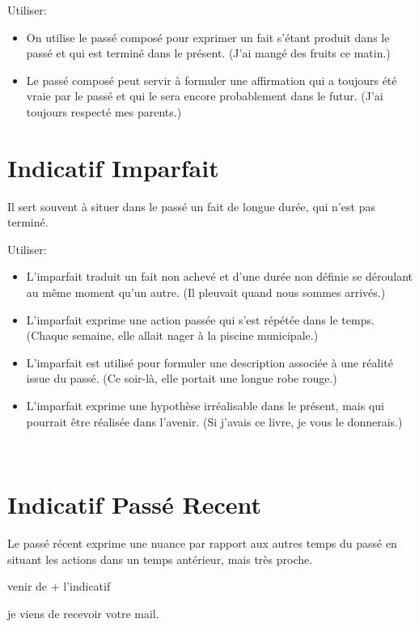 \documentclass{article}
\begin{document}
Utiliser:
\begin{itemize}
\item On utilise le passé composé pour exprimer un fait s'étant produit dans le passé et qui est terminé dans le présent. (J'ai mangé des fruits ce matin.)
\item Le passé composé peut servir à formuler une affirmation qui a toujours été vraie par le passé et qui le sera encore probablement dans le futur. (J'ai toujours respecté mes parents.)
\end{itemize}

\section{Indicatif Imparfait}

Il sert souvent à situer dans le passé un fait de longue durée, qui n'est pas terminé. 

Utiliser:
\begin{itemize}
\item L'imparfait traduit un fait non achevé et d'une durée non définie se déroulant au même moment qu'un autre. (Il pleuvait quand nous sommes arrivés.)
\item L'imparfait exprime une action passée qui s'est répétée dans le temps. (Chaque semaine, elle allait nager à la piscine municipale.)
\item L'imparfait est utilisé pour formuler une description associée à une réalité issue du passé. (Ce soir-là, elle portait une longue robe rouge.)
\item L'imparfait exprime une hypothèse irréalisable dans le présent, mais qui pourrait être réalisée dans l'avenir. (Si j'avais ce livre, je vous le donnerais.)
\end{itemize}
​

\section{Indicatif Passé Recent}

Le passé récent exprime une nuance par rapport aux autres temps du passé en situant les actions dans un temps antérieur, mais très proche.

\begin{tcolorbox}
  venir de + l'indicatif
\end{tcolorbox}

je viens de recevoir votre mail.
\end{document}

